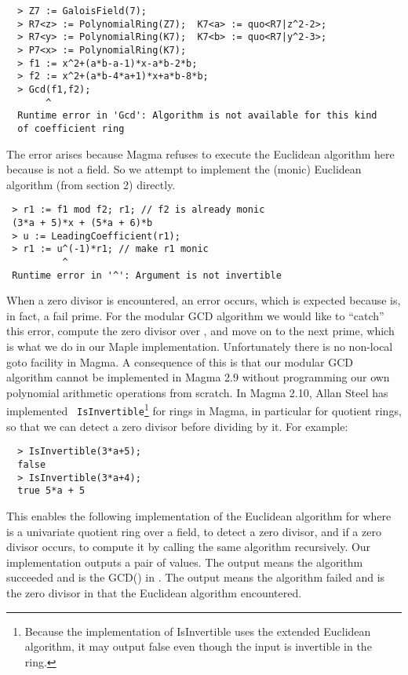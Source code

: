 \documentclass[10pt]{article}
\begin{document}
{ \small
\begin{verbatim}
  > Z7 := GaloisField(7);
  > R7<z> := PolynomialRing(Z7);  K7<a> := quo<R7|z^2-2>;
  > R7<y> := PolynomialRing(K7);  K7<b> := quo<R7|y^2-3>;
  > P7<x> := PolynomialRing(K7);
  > f1 := x^2+(a*b-a-1)*x-a*b-2*b;
  > f2 := x^2+(a*b-4*a+1)*x+a*b-8*b;
  > Gcd(f1,f2);
       ^
  Runtime error in 'Gcd': Algorithm is not available for this kind
  of coefficient ring
\end{verbatim}
}

\noindent
The error arises because Magma refuses to execute the Euclidean
algorithm here because  is not a field.  So we attempt to
implement the (monic) Euclidean algorithm (from section 2) directly.

{ \small
\begin{verbatim}
 > r1 := f1 mod f2; r1; // f2 is already monic
 (3*a + 5)*x + (5*a + 6)*b
 > u := LeadingCoefficient(r1);
 > r1 := u^(-1)*r1; // make r1 monic
          ^
 Runtime error in '^': Argument is not invertible
\end{verbatim}
}

\noindent When a zero divisor is encountered, an error occurs, which
is expected because  is, in fact, a fail prime. For the modular
GCD algorithm we would like to ``catch'' this error, compute the
zero divisor over , and move on to the next prime, which is
what we do in our Maple implementation.  Unfortunately there is no
non-local goto facility in Magma.  A consequence of this is that our
modular GCD algorithm cannot be implemented in Magma 2.9 without
programming our own polynomial arithmetic operations from scratch.
In Magma 2.10, Allan Steel has implemented {\tt
IsInvertible}\footnote{Because the implementation of IsInvertible
uses the extended Euclidean algorithm, it may output false even
though the input is invertible in the ring.} for rings in Magma, in
particular for quotient rings, so that we can detect a zero divisor
before dividing by it. For example:

{ \small
\begin{verbatim}
  > IsInvertible(3*a+5);
  false
  > IsInvertible(3*a+4);
  true 5*a + 5
\end{verbatim}
}

\noindent This enables the following implementation of the Euclidean
algorithm for  where  is a univariate quotient
ring over a field, to detect a zero divisor, and if a zero divisor
occurs, to compute it by calling the same algorithm recursively. Our
implementation outputs a pair of values. The output  means
the algorithm succeeded and  is the GCD() in . The
output  means the algorithm failed and  is the zero
divisor in  that the Euclidean algorithm encountered.
\end{document}
